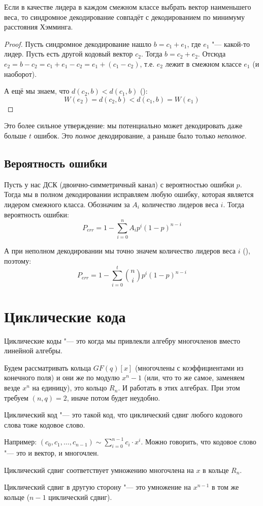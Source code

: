 \begin{theorem}
	Если в качестве лидера в каждом смежном классе выбрать
	вектор наименьшего веса, то синдромное декодирование
	совпадёт с декодированием по минимуму расстояния Хэмминга.
\end{theorem}
\begin{proof}
	Пусть синдромное декодирование нашло $b=c_1+e_1$,
	где $e_1$ "--- какой-то лидер.
	Пусть есть другой кодовый вектор $c_2$.
	Тогда $b=c_2+e_2$.
	Отсюда $e_2=b-c_2=c_1+e_1-c_2=e_1+(c_1-c_2)$,
	т.е. $e_2$ лежит в смежном классе $e_1$ (и наоборот).

	А ещё мы знаем, что $d(c_2, b) < d(c_1, b)$ (\TODO):
	\[
		W(e_2) = d(c_2, b) < d(c_1, b) = W(e_1)
	\]
\end{proof}
\begin{Rem}
	Это более сильное утверждение: мы потенциально может декодировать даже
	больше $t$ ошибок.
	Это \textit{полное} декодирование, а раньше было только \textit{неполное}.
\end{Rem}

\subsection{Вероятность ошибки}
Пусть у нас ДСК (двоично-симметричный канал) с вероятностью ошибки $p$.
Тогда мы в полном декодировании исправляем любую ошибку, которая является лидером смежного класса.
Обозначим за $A_i$ количество лидеров веса $i$.
Тогда вероятность ошибки:
\[
	P_{err} = 1 - \sum_{i=0}^n A_i p^i (1-p)^{n-i}
\]

А при неполном декодировании мы точно значем количество лидеров веса $i$
(\TODO), поэтому:
\[
	P_{err} = 1 - \sum_{i=0}^t \binom{n}{i} p^i (1-p)^{n-i}
\]

\section{Циклические кода}
Циклические коды "--- это когда мы привлекли алгебру многочленов вместо линейной алгебры.

Будем рассматривать кольца $GF(q)[x]$ (многочлены с коэффициентами из конечного поля)
и они же по модулю $x^n-1$ (или, что то же самое, заменяем везде $x^n$ на единицу), это кольцо $R_n$.
И работать в этих алгебрах.
При этом требуем $(n,q)=2$, иначе потом будет неудобно.

Циклический код "--- это такой код, что циклический сдвиг любого кодового слова тоже кодовое слово.

Например: $(c_0, c_1, \dots, c_{n-1}) \sim \sum_{i=0}^{n-1} c_i\cdot x^i$.
Можно говорить, что кодовое слово "--- это и вектор, и многочлен.

\begin{theorem}
	Циклический сдвиг соответствует умножению многочлена на $x$ в кольце $R_n$.
\end{theorem}
\begin{Rem}
	Циклический сдвиг в другую сторону "--- это умножение на $x^{n-1}$ в том же кольце
	($n-1$ циклический сдвиг).
\end{Rem}
